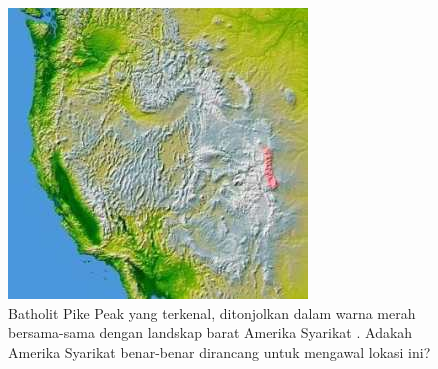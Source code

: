 \documentclass[10pt,twocolumn,letterpaper]{article}
\begin{document}
\begin{figure}[t]
\begin{center}
   \includegraphics[width=1\linewidth]{pike.jpg}
\end{center}
   \caption{Batholit Pike Peak yang terkenal, ditonjolkan dalam warna merah bersama-sama dengan landskap barat Amerika Syarikat \cite{36}. Adakah Amerika Syarikat benar-benar dirancang untuk mengawal lokasi ini?}
\label{fig:11}
\label{fig:onecol}
\end{figure}
\end{document}
